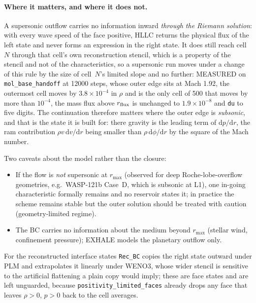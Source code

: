 \documentclass[english,a4paper]{my_memo}
\begin{document}
\paragraph{Where it matters, and where it does not.}
A supersonic outflow carries no information inward \emph{through the Riemann
solution}: with every wave speed of the face positive, HLLC returns the
physical flux of the left state and never forms an expression in the right
state. It does still reach cell~$N$ through that cell's own reconstruction
stencil, which is a property of the stencil and not of the characteristics,
so a supersonic run moves under a change of this rule by the size of
cell~$N$'s limited slope and no further: MEASURED on
\texttt{mol\_base\_handoff} at 12000 steps, whose outer edge sits at Mach
1.92, the outermost cell moves by $3.8\times10^{-4}$ in $\rho$ and is the
only cell of 500 that moves by more than $10^{-4}$, the mass flux above
$r_{\rm flux}$ is unchanged to $1.9\times10^{-8}$ and \texttt{du} to five
digits. The continuation therefore matters where the outer edge is
\emph{subsonic}, and that is the state it is built for: there gravity is the
leading term of $\mathrm{d}p/\mathrm{d}r$, the ram contribution
$\rho v\,\mathrm{d}v/\mathrm{d}r$ being smaller than $\rho\,
\mathrm{d}\phi/\mathrm{d}r$ by the square of the Mach number.

Two caveats about the model rather than the closure:
\begin{itemize}
\item If the flow is \emph{not} supersonic at $r_{\max}$ (observed for
  deep Roche-lobe-overflow geometries, e.g.\ WASP-121b Case~D, which
  is subsonic at L1), one in-going characteristic formally remains and
  no reservoir states it; in practice the scheme remains stable but the
  outer solution should be treated with caution (geometry-limited
  regime).
\item The BC carries no information about the medium beyond $r_{\max}$
  (stellar wind, confinement pressure); EXHALE models the planetary
  outflow only.
\end{itemize}

For the reconstructed interface states \texttt{Rec\_BC} copies the right
state outward under PLM and extrapolates it linearly under WENO3, whose
wider stencil is sensitive to the artificial flattening a plain copy would
imply; these are face states and are left unguarded, because
\texttt{positivity\_limited\_faces} already drops any face that leaves
$\rho > 0$, $p > 0$ back to the cell averages.
\end{document}
